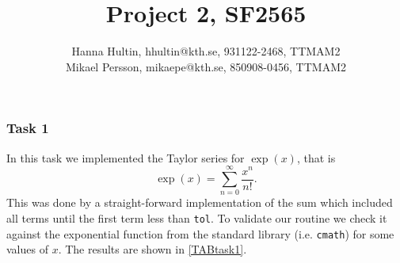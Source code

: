 \documentclass[a4paper,10pt]{article}
\title{Project 2, SF2565}
\author{Hanna Hultin, hhultin@kth.se, 931122-2468, TTMAM2 \\ Mikael Persson, mikaepe@kth.se, 850908-0456, TTMAM2}
\begin{document}
\maketitle

\subsubsection*{Task 1}
In this task we implemented the Taylor series for $\exp (x)$, that is 
\begin{equation*}
  \exp(x) = \sum_{n=0}^\infty \frac{x^{n}}{n!}.
\end{equation*}
This was done by a straight-forward implementation of the 
sum which included all terms until the first term less than \texttt{tol}.
To validate our routine we check it against the exponential function from the 
standard library (i.e. \texttt{cmath}) for some values of $x$. 
The results are shown in \ref{TABtask1}.
\end{document}
